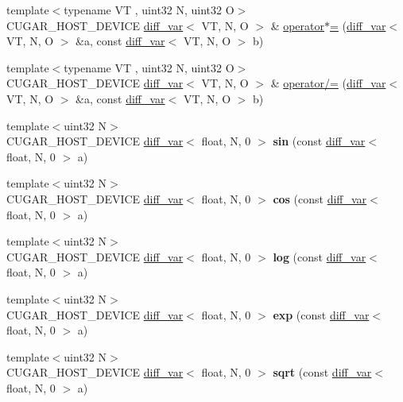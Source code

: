 \begin{DoxyCompactItemize}
\item 
{\footnotesize template$<$typename VT , uint32 N, uint32 O$>$ }\\C\+U\+G\+A\+R\+\_\+\+H\+O\+S\+T\+\_\+\+D\+E\+V\+I\+CE \hyperlink{structcugar_1_1diff__var}{diff\+\_\+var}$<$ VT, N, O $>$ \& \hyperlink{group___auto_diff_module_ga46821702fe79221bbcde83e9bd2bff20}{operator$\ast$=} (\hyperlink{structcugar_1_1diff__var}{diff\+\_\+var}$<$ VT, N, O $>$ \&a, const \hyperlink{structcugar_1_1diff__var}{diff\+\_\+var}$<$ VT, N, O $>$ b)
\item 
{\footnotesize template$<$typename VT , uint32 N, uint32 O$>$ }\\C\+U\+G\+A\+R\+\_\+\+H\+O\+S\+T\+\_\+\+D\+E\+V\+I\+CE \hyperlink{structcugar_1_1diff__var}{diff\+\_\+var}$<$ VT, N, O $>$ \& \hyperlink{group___auto_diff_module_ga3b4318e910a931b341f25f7918f98ec3}{operator/=} (\hyperlink{structcugar_1_1diff__var}{diff\+\_\+var}$<$ VT, N, O $>$ \&a, const \hyperlink{structcugar_1_1diff__var}{diff\+\_\+var}$<$ VT, N, O $>$ b)
\item 
{\footnotesize template$<$uint32 N$>$ }\\C\+U\+G\+A\+R\+\_\+\+H\+O\+S\+T\+\_\+\+D\+E\+V\+I\+CE \hyperlink{structcugar_1_1diff__var}{diff\+\_\+var}$<$ float, N, 0 $>$ {\bfseries sin} (const \hyperlink{structcugar_1_1diff__var}{diff\+\_\+var}$<$ float, N, 0 $>$ a)
\item 
{\footnotesize template$<$uint32 N$>$ }\\C\+U\+G\+A\+R\+\_\+\+H\+O\+S\+T\+\_\+\+D\+E\+V\+I\+CE \hyperlink{structcugar_1_1diff__var}{diff\+\_\+var}$<$ float, N, 0 $>$ {\bfseries cos} (const \hyperlink{structcugar_1_1diff__var}{diff\+\_\+var}$<$ float, N, 0 $>$ a)
\item 
{\footnotesize template$<$uint32 N$>$ }\\C\+U\+G\+A\+R\+\_\+\+H\+O\+S\+T\+\_\+\+D\+E\+V\+I\+CE \hyperlink{structcugar_1_1diff__var}{diff\+\_\+var}$<$ float, N, 0 $>$ {\bfseries log} (const \hyperlink{structcugar_1_1diff__var}{diff\+\_\+var}$<$ float, N, 0 $>$ a)
\item 
{\footnotesize template$<$uint32 N$>$ }\\C\+U\+G\+A\+R\+\_\+\+H\+O\+S\+T\+\_\+\+D\+E\+V\+I\+CE \hyperlink{structcugar_1_1diff__var}{diff\+\_\+var}$<$ float, N, 0 $>$ {\bfseries exp} (const \hyperlink{structcugar_1_1diff__var}{diff\+\_\+var}$<$ float, N, 0 $>$ a)
\item 
{\footnotesize template$<$uint32 N$>$ }\\C\+U\+G\+A\+R\+\_\+\+H\+O\+S\+T\+\_\+\+D\+E\+V\+I\+CE \hyperlink{structcugar_1_1diff__var}{diff\+\_\+var}$<$ float, N, 0 $>$ {\bfseries sqrt} (const \hyperlink{structcugar_1_1diff__var}{diff\+\_\+var}$<$ float, N, 0 $>$ a)

\end{DoxyCompactItemize}

